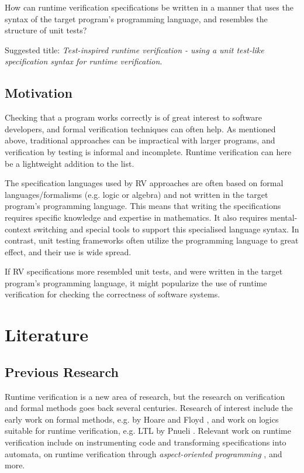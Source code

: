 \documentclass[a4paper,11pt]{article}
\begin{document}
How can runtime verification specifications be written in a manner that uses the syntax of
the target program's programming language, and resembles the structure of unit tests?

Suggested title: \textit{Test-inspired runtime verification - using a unit test-like specification syntax for runtime verification}.


\subsection{Motivation}

Checking that a program works correctly is of great interest to software developers, and
formal verification techniques can often help. As mentioned above, traditional approaches
can be impractical with larger programs, and verification by testing is
informal and incomplete.
Runtime verification can here be a lightweight addition to the list.

The specification languages used by RV approaches are often based
on formal languages/formalisms (e.g. logic or algebra) and not written in the target program's programming language. 
This means that writing the specifications requires specific knowledge and expertise in mathematics. 
It also requires mental-context switching and special tools
to support this specialised language syntax. In contrast, unit testing frameworks often
utilize the programming language to great effect, and their use is wide spread.

If RV specifications more resembled unit tests, and were written in the target program's
programming language, it might popularize the use of runtime verification for
checking the correctness of software systems.


\section{Literature}

\subsection{Previous Research}

Runtime verification is a new area of research, but the research on verification and formal methods goes back several centuries. Research of interest include the early work on formal methods, e.g. by Hoare \cite{hoare69} and Floyd \cite{floyd67}, and work on logics suitable for runtime verification, e.g. LTL by Pnueli \cite{pnueli77}. Relevant work on runtime verification include \cite{bauer06} on instrumenting code and transforming specifications into automata, \cite{bodden05} on runtime verification through \emph{aspect-oriented programming} \cite{aspectj}, and more. 
\end{document}
